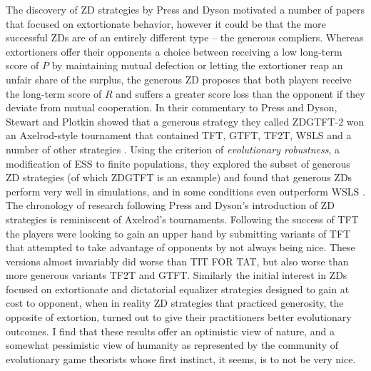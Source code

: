 The discovery of ZD strategies by Press and Dyson motivated a number of papers that focused on extortionate behavior, however it could be that the more successful ZDs are of an entirely different type -- the generous compliers. Whereas extortioners offer their opponents a choice between receiving a low long-term score of $P$ by maintaining mutual defection or letting the extortioner reap an unfair share of the surplus, the generous ZD proposes that both players receive the long-term score of $R$ and suffers a greater score loss than the opponent if they deviate from mutual cooperation. In their commentary to Press and Dyson, Stewart and Plotkin showed that a generous strategy they called ZDGTFT-2 won an Axelrod-style tournament that contained TFT, GTFT, TF2T, WSLS and a number of other strategies \cite{Stewart26062012}. Using the criterion of \textit{evolutionary robustness}, a modification of ESS to finite populations, they explored the subset of generous ZD strategies (of which ZDGTFT is an example) and found that generous ZDs perform very well in simulations, and in some conditions even outperform WSLS \cite{Stewart03092013}. The chronology of research following Press and Dyson's introduction of ZD strategies is reminiscent of Axelrod's tournaments. Following the success of TFT the players were looking to gain an upper hand by submitting variants of TFT that attempted to take advantage of opponents by not always being nice. These versions almost invariably did worse than TIT FOR TAT, but also worse than more generous variants TF2T and GTFT. Similarly the initial interest in ZDs focused on extortionate and dictatorial equalizer strategies designed to gain at cost to opponent, when in reality ZD strategies that practiced generosity, the opposite of extortion, turned out to give their practitioners better evolutionary outcomes. I find that these results offer an optimistic view of nature, and a somewhat pessimistic view of humanity as represented by the community of evolutionary game theorists whose first instinct, it seems, is to not be very nice.

